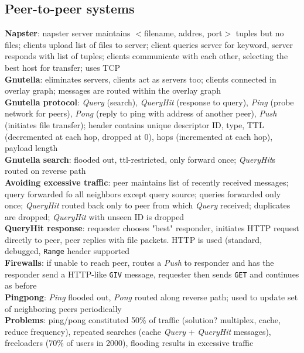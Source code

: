 \documentclass{article}
\begin{document}
\begin{multicols*}{3}
\section{Peer-to-peer systems}
\textbf{Napster}: napster server maintains $<$filename, addres, port$>$ tuples but no files; clients upload list of files to server; client queries server for keyword, server responds with list of tuples; clients communicate with each other, selecting the best host for transfer; uses TCP \\
\textbf{Gnutella}: eliminates servers, clients act as servers too; clients connected in overlay graph; messages are routed within the overlay graph \\
\textbf{Gnutella protocol}: \textit{Query} (search), \textit{QueryHit} (response to query), \textit{Ping} (probe network for peers), \textit{Pong} (reply to ping with address of another peer), \textit{Push} (initiates file transfer); header contains unique descriptor ID, type, TTL (decremented at each hop, dropped at 0), hops (incremented at each hop), payload length \\
\textbf{Gnutella search}: flooded out, ttl-restricted, only forward once; \textit{QueryHit}s routed on reverse path \\
\textbf{Avoiding excessive traffic}: peer maintains list of recently received messages; query forwarded fo all neighbors except query source; queries forwarded only once; \textit{QueryHit} routed back only to peer from which \textit{Query} received; duplicates are dropped; \textit{QueryHit} with unseen ID is dropped \\
\textbf{QueryHit response}: requester chooses "best" responder, initiates HTTP request directly to peer, peer replies with file packets. HTTP is used (standard, debugged, \texttt{Range} header supported \\
\textbf{Firewalls}: if unable to reach peer, routes a \textit{Push} to responder and has the responder send a HTTP-like \texttt{GIV} message, requester then sends \texttt{GET} and continues as before \\
\textbf{Pingpong}: \textit{Ping} flooded out, \textit{Pong} routed along reverse path; used to update set of neighboring peers periodically \\
\textbf{Problems}: ping/pong constituted 50\% of traffic (solution? multiplex, cache, reduce frequency), repeated searches (cache \textit{Query} + \textit{QueryHit} messages), freeloaders (70\% of users in 2000), flooding results in excessive traffic \\

\end{multicols*}
\end{document}

